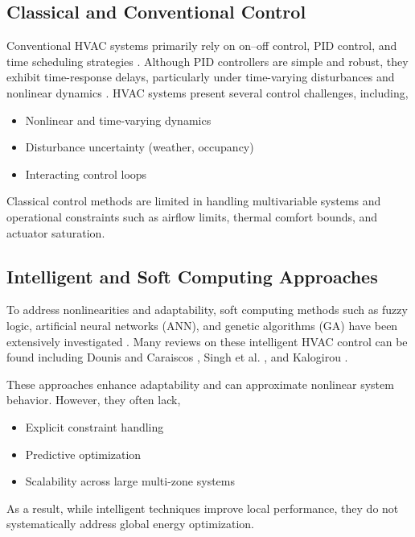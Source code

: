\documentclass[twocolumn,11pt,a4paper]{article}
\begin{document}
\subsection{Classical and Conventional Control}
Conventional HVAC systems primarily rely on on–off control, PID control, and time scheduling strategies \cite{harroldAutomaticControlsBuilding1988}. Although PID controllers are simple and robust, they exhibit time-response delays, particularly under time-varying disturbances and nonlinear dynamics \cite{balaliEnergyModellingControl2023}. HVAC systems present several control challenges, including,
\begin{itemize}
    \item Nonlinear and time-varying dynamics
    \item Disturbance uncertainty (weather, occupancy)
    \item Interacting control loops
\end{itemize}
Classical control methods are limited in handling multivariable systems and operational constraints such as airflow limits, thermal comfort bounds, and actuator saturation.

\subsection{Intelligent and Soft Computing Approaches}
To address nonlinearities and adaptability, soft computing methods such as fuzzy logic, artificial neural networks (ANN), and genetic algorithms (GA) have been extensively investigated \cite{naiduAdvancedControlStrategies2011}. Many reviews on these intelligent HVAC control can be found including Dounis and Caraiscos \cite{dounisAdvancedControlSystems2009}, Singh et al. \cite{singhFuzzyModelingControl2009}, and Kalogirou \cite{kalogirouArtificialNeuralNetworks2009}.

These approaches enhance adaptability and can approximate nonlinear system behavior. However, they often lack,

\begin{itemize}
    \item Explicit constraint handling
    \item Predictive optimization
    \item Scalability across large multi-zone systems
\end{itemize}

As a result, while intelligent techniques improve local performance, they do not systematically address global energy optimization.
\end{document}
